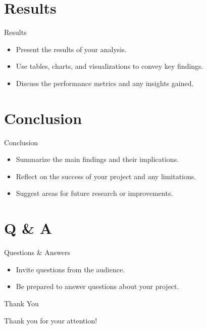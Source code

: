 \documentclass{beamer}
\begin{document}
\section{Results}

\begin{frame}{Results}
\begin{itemize}
  \item Present the results of your analysis.
  \item Use tables, charts, and visualizations to convey key findings.
  \item Discuss the performance metrics and any insights gained.
\end{itemize}
\end{frame}

\section{Conclusion}

\begin{frame}{Conclusion}
\begin{itemize}
  \item Summarize the main findings and their implications.
  \item Reflect on the success of your project and any limitations.
  \item Suggest areas for future research or improvements.
\end{itemize}
\end{frame}

\section{Q \& A}

\begin{frame}{Questions \& Answers}
\begin{itemize}
  \item Invite questions from the audience.
  \item Be prepared to answer questions about your project.
\end{itemize}
\end{frame}

\begin{frame}{Thank You}
\begin{center}
\Huge Thank you for your attention!
\end{center}
\end{frame}
\end{document}
